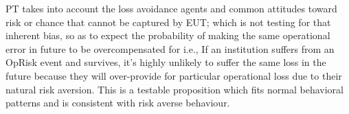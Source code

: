 \documentclass[]{article}
\begin{document}
PT takes into account the loss avoidance agents and common attitudes
toward risk or chance that cannot be captured by EUT; which is not
testing for that inherent bias, so as to expect the probability of
making the same operational error in future to be overcompensated for
i.e., If an institution suffers from an OpRisk event and survives, it's
highly unlikely to suffer the same loss in the future because they will
over-provide for particular operational loss due to their natural risk
aversion. This is a testable proposition which fits normal behavioral
patterns and is consistent with risk averse behaviour.

\singlespacing
\end{document}

